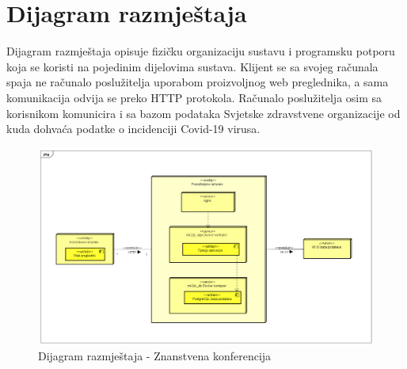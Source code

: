 		

		
		\section{Dijagram razmještaja}
		
		Dijagram razmještaja opisuje fizičku organizaciju sustavu i programsku potporu koja se koristi na pojedinim dijelovima sustava. Klijent se sa svojeg računala spaja ne računalo poslužitelja uporabom proizvoljnog web preglednika, a sama komunikacija odvija se preko HTTP protokola. Računalo poslužitelja osim sa korisnikom komunicira i sa bazom podataka Svjetske zdravstvene organizacije od kuda dohvaća podatke o incidenciji Covid-19 virusa.
			 
			 
			\begin{figure}[H]
			 	\includegraphics[width= 15 cm, height= 25 cm, keepaspectratio]{dijagrami/Diagram razmjestaja.png} 
			 	\centering
			 	\caption{Dijagram razmještaja - Znanstvena konferencija}
			 	\label{fig:act5}
			 \end{figure}

